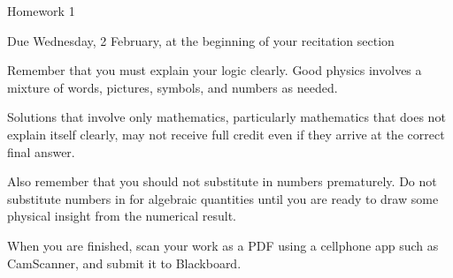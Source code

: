 \documentclass[12pt]{article}
\begin{document}
\begin{center}
\Large
\sc Homework 1 \rm


\normalsize

Due Wednesday, 2 February, at the beginning of your recitation section
\end{center}

Remember that you must explain your logic clearly. Good physics involves a mixture of words, pictures, symbols, and numbers as needed.


Solutions that involve
only mathematics, particularly mathematics that does not explain itself clearly, may not receive full credit even if they arrive at the correct final answer.

Also remember that you should not substitute in numbers prematurely. Do not substitute numbers in for algebraic quantities until you are ready to draw some physical insight from the numerical result.

When you are finished, scan your work as a PDF using a cellphone app such as CamScanner, and submit it to Blackboard.

\begin{center}
	
	\underline{\hspace{3in}}
\end{center}


\normalsize
\end{document}
